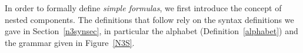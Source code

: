 In order to formally define \emph{simple formulas}, we first introduce the concept of nested components.
The definitions that follow rely on the syntax definitions we gave in Section~\ref{n3synsec}, in particular the \nthree alphabet (Definition~\ref{alphabet}) 
and the grammar given in 
Figure~\ref{N3S}. 
%
% 
% 
% 
